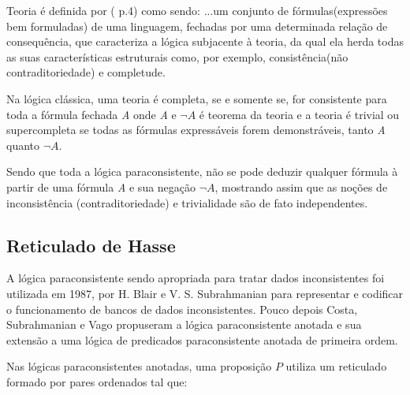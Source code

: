 Teoria é definida por \citeauthor{Gomes2013}(\citeyear{Gomes2013} p.4) como sendo:
\citacao
{
...um conjunto de fórmulas(expressões bem formuladas) de uma linguagem, fechadas por uma determinada relação de consequência, que caracteriza a lógica subjacente à teoria, da qual ela herda todas as suas características estruturais como, por exemplo, consistência(não contraditoriedade) e completude.
}

Na lógica clássica, uma teoria é completa, se e somente se, for consistente para toda a fórmula fechada \emph{A} onde \emph{A} e \emph{$\neg A$} é teorema da teoria e a teoria é trivial ou supercompleta se todas as fórmulas expressáveis forem demonstráveis, tanto \emph{A} quanto \emph{$ \neg A$}.


Sendo que toda a lógica paraconsistente, não se pode deduzir qualquer fórmula à partir de uma fórmula \emph{A} e sua negação \emph{$\neg A$}, mostrando assim que as noções de inconsistência (contraditoriedade) e trivialidade são de fato independentes.







\subsection{Reticulado de Hasse}

A lógica paraconsistente sendo apropriada para tratar dados inconsistentes foi utilizada em 1987, por H. Blair e V. S. Subrahmanian para representar e codificar o funcionamento de bancos de dados inconsistentes. Pouco depois Costa, Subrahmanian e Vago propuseram a lógica paraconsistente anotada e sua extensão a uma lógica de predicados paraconsistente anotada de primeira ordem. 

Nas lógicas paraconsistentes anotadas, uma proposição $P$ utiliza um reticulado formado por pares ordenados tal que: 

